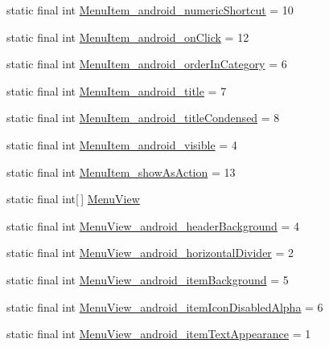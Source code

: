 \begin{DoxyCompactItemize}
\item 
static final int \hyperlink{classcheck_1_1test_1_1_r_1_1styleable_ab191ae989550111a8c237ae16c0edddb}{Menu\+Item\+\_\+android\+\_\+numeric\+Shortcut} = 10
\item 
static final int \hyperlink{classcheck_1_1test_1_1_r_1_1styleable_ab293bb00a7a1be438c2631ec1b79c3cf}{Menu\+Item\+\_\+android\+\_\+on\+Click} = 12
\item 
static final int \hyperlink{classcheck_1_1test_1_1_r_1_1styleable_a65a13cc3cfb4d4146adc454569280de7}{Menu\+Item\+\_\+android\+\_\+order\+In\+Category} = 6
\item 
static final int \hyperlink{classcheck_1_1test_1_1_r_1_1styleable_a156b50bbe0771f25d5dab6d62c313320}{Menu\+Item\+\_\+android\+\_\+title} = 7
\item 
static final int \hyperlink{classcheck_1_1test_1_1_r_1_1styleable_a789a23064482ca589c0b3d8f0a0adaae}{Menu\+Item\+\_\+android\+\_\+title\+Condensed} = 8
\item 
static final int \hyperlink{classcheck_1_1test_1_1_r_1_1styleable_a1c79d64eac1e675e15e462194f67b098}{Menu\+Item\+\_\+android\+\_\+visible} = 4
\item 
static final int \hyperlink{classcheck_1_1test_1_1_r_1_1styleable_aa76aaf06f02ab88d86f636df6aa194a3}{Menu\+Item\+\_\+show\+As\+Action} = 13
\item 
static final int\mbox{[}$\,$\mbox{]} \hyperlink{classcheck_1_1test_1_1_r_1_1styleable_acb1b5275ffcfc132a3221b157fed1ff8}{Menu\+View}
\item 
static final int \hyperlink{classcheck_1_1test_1_1_r_1_1styleable_a4e4a179bc404d7aa3f2a2a031b3637e3}{Menu\+View\+\_\+android\+\_\+header\+Background} = 4
\item 
static final int \hyperlink{classcheck_1_1test_1_1_r_1_1styleable_a46412e274f28015595ca468aa91c144f}{Menu\+View\+\_\+android\+\_\+horizontal\+Divider} = 2
\item 
static final int \hyperlink{classcheck_1_1test_1_1_r_1_1styleable_a33a367daf559b4bb77461ec037d3e86f}{Menu\+View\+\_\+android\+\_\+item\+Background} = 5
\item 
static final int \hyperlink{classcheck_1_1test_1_1_r_1_1styleable_ac4582a310c88c18ea4a50f11ff473f68}{Menu\+View\+\_\+android\+\_\+item\+Icon\+Disabled\+Alpha} = 6
\item 
static final int \hyperlink{classcheck_1_1test_1_1_r_1_1styleable_ad1f162a33f4a61b0900eb474fd824ddb}{Menu\+View\+\_\+android\+\_\+item\+Text\+Appearance} = 1
\item 

\end{DoxyCompactItemize}

